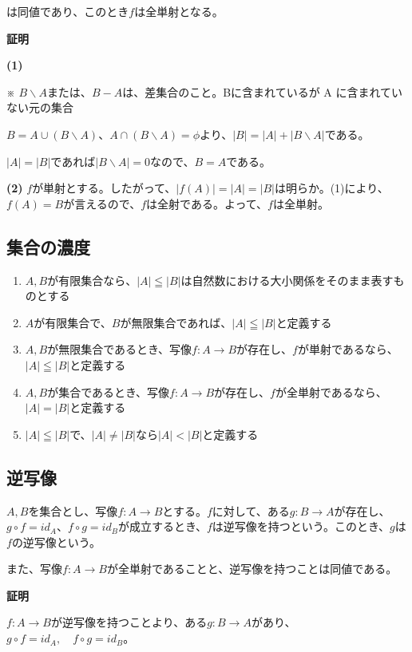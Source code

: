 \documentclass[dvipdfmx,autodetect-engine]{jsarticle}
\begin{document}
は同値であり、このとき$f$は全単射となる。

{\bf 証明}

{\bf (1)}

※ $B \backslash A$または、$B-A$は、差集合のこと。Bに含まれているが A に含まれていない元の集合

$B = A \cup (B \backslash A)$、$A \cap (B \backslash A) = \phi$より、$ |B| = |A| + |B\backslash A|$である。

$|A| = |B|$であれば$|B \backslash A| = 0$なので、$B = A$である。

{\bf (2)}
$f$が単射とする。したがって、$|f(A)| = |A| = |B|$は明らか。(1)により、$f(A) = B$が言えるので、$f$は全射である。よって、$f$は全単射。

\subsection{集合の濃度}


\begin{enumerate}
\renewcommand{\labelenumi}{(\arabic{enumi})}
\item $A, B$が有限集合なら、$|A| \leqq |B|$は自然数における大小関係をそのまま表すものとする
\item $A$が有限集合で、$B$が無限集合であれば、$|A| \leqq |B|$と定義する
\item $A, B$が無限集合であるとき、写像$f: A \to B$が存在し、$f$が単射であるなら、$|A| \leqq |B|$と定義する
\item $A, B$が集合であるとき、写像$f: A \to B$が存在し、$f$が全単射であるなら、$|A| = |B|$と定義する
\item $|A| \leqq |B|$で、$|A| \neq |B|$なら$|A| < |B|$と定義する
\end{enumerate}

\subsection{逆写像}

$A, B$を集合とし、写像$f: A \to B$とする。$f$に対して、ある$g: B \to A$が存在し、$g \circ f = id_{A}$、$f \circ g = id_{B}$が成立するとき、$f$は逆写像を持つという。このとき、$g$は$f$の逆写像という。

また、写像$f:A \to B$が全単射であることと、逆写像を持つことは同値である。

{ \bf 証明 }

$f: A \to B$が逆写像を持つことより、ある$g: B \to A$があり、$g \circ f = id_{A}, \quad f \circ g = id_{B}$。
\end{document}
